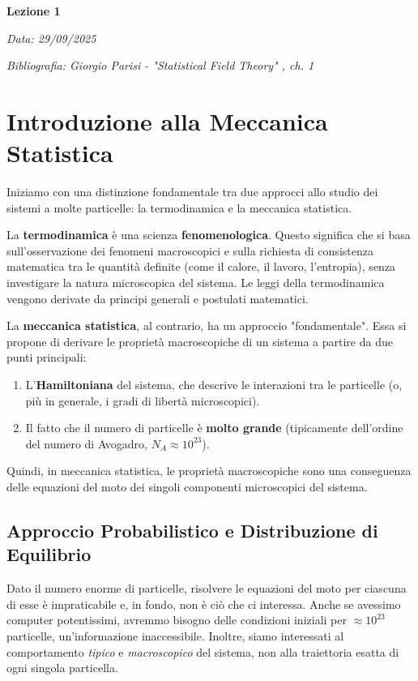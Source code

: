 \Huge{\textbf{Lezione 1}}
\label{chap:lezione_01} %

\begin{flushright}
\textit{Data: 29/09/2025}
\end{flushright}
\textit{Bibliografia: Giorgio Parisi - "Statistical Field Theory" , ch. 1}


\section{Introduzione alla Meccanica Statistica}

Iniziamo con una distinzione fondamentale tra due approcci allo studio dei sistemi a molte particelle: la termodinamica e la meccanica statistica.

La \textbf{termodinamica} è una scienza \textbf{fenomenologica}. Questo significa che si basa sull'osservazione dei fenomeni macroscopici e sulla richiesta di consistenza matematica tra le quantità definite (come il calore, il lavoro, l'entropia), senza investigare la natura microscopica del sistema. Le leggi della termodinamica vengono derivate da principi generali e postulati matematici.

La \textbf{meccanica statistica}, al contrario, ha un approccio "fondamentale". Essa si propone di derivare le proprietà macroscopiche di un sistema a partire da due punti principali:
\begin{enumerate}
    \item L'\textbf{Hamiltoniana} del sistema, che descrive le interazioni tra le particelle (o, più in generale, i gradi di libertà microscopici).
    \item Il fatto che il numero di particelle è \textbf{molto grande} (tipicamente dell'ordine del numero di Avogadro, $N_A \approx 10^{23}$).
\end{enumerate}
Quindi, in meccanica statistica, le proprietà macroscopiche sono una conseguenza delle equazioni del moto dei singoli componenti microscopici del sistema.

\subsection{Approccio Probabilistico e Distribuzione di Equilibrio}

Dato il numero enorme di particelle, risolvere le equazioni del moto per ciascuna di esse è impraticabile e, in fondo, non è ciò che ci interessa. Anche se avessimo computer potentissimi, avremmo bisogno delle condizioni iniziali per $\approx 10^{23}$ particelle, un'informazione inaccessibile. Inoltre, siamo interessati al comportamento \textit{tipico} e \textit{macroscopico} del sistema, non alla traiettoria esatta di ogni singola particella.

